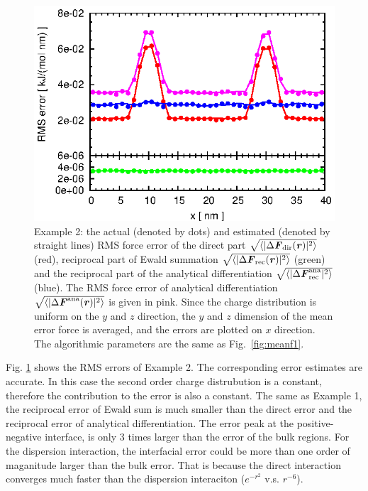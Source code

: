 \documentclass[aps,pre,preprint]{revtex4}
\renewcommand{\v}[1]{\textbf{\textit{#1}}}
\begin{document}
\begin{figure}
  \centering
  \includegraphics[]{fig/error.two_peaks_sep.box40x20x20.b1.000.r3.00.n6.K101x051x051/fig.ana.ewald.error.eps}
  \caption{Example 2: the actual (denoted by dots) and estimated
    (denoted by straight lines) RMS force error of the direct part
    $\sqrt{\langle\vert\Delta \v F_{\textrm{dir}}(\v
      r)\vert^2\rangle}$ (red), reciprocal part of Ewald summation
    $\sqrt{\langle\vert\Delta \v F_{\textrm{rec}}(\v
      r)\vert^2\rangle}$ (green) and the reciprocal part of the
    analytical differentiation $\sqrt{\langle\vert\Delta \v
      F^{\textrm{ana}}_{\textrm{rec}}\vert^2\rangle}$ (blue). The RMS
    force error of analytical differentiation
    $\sqrt{\langle\vert\Delta \v F^{\textrm{ana}}(\v
      r)\vert^2\rangle}$ is given in pink.  Since the charge
    distribution is uniform on the $y$ and $z$ direction, the $y$ and
    $z$ dimension of the mean error force is averaged, and the errors
    are plotted on $x$ direction. The algorithmic parameters are the
    same as Fig.~\ref{fig:meanf1}.}
  \label{fig:error2}
\end{figure}


Fig. \ref{fig:error2} shows the RMS errors of Example 2. The
corresponding error estimates are accurate. In this case the second
order charge distrubution is a constant, therefore the contribution to
the error is also a constant. The same as Example 1, the reciprocal
error of Ewald sum is much smaller than the direct error and the
reciprocal error of analytical differentiation.  The error peak at the
positive-negative interface, is only 3 times larger than the error of
the bulk regions. For the dispersion interaction, the interfacial
error could be more than one order of maganitude larger than the bulk
error. That is because the direct interaction converges much faster
than the dispersion interaciton ($e^{-r^2}$ v.s. $r^{-6}$).
\end{document}
